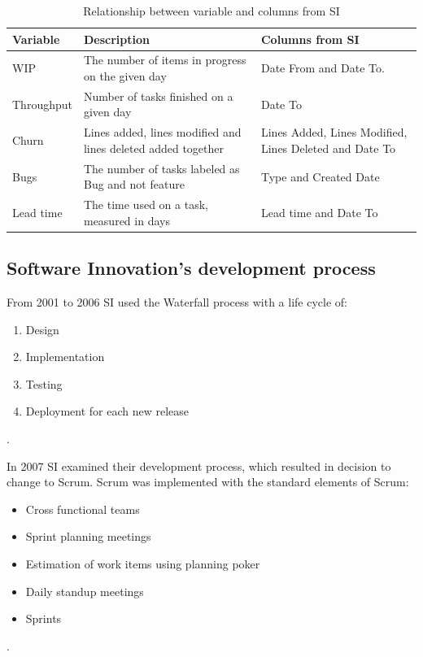 \documentclass[UKenglish]{ifimaster}  %
\begin{document}
\newpage


\begin{table}[!ht]
\begin{center}
    \begin{tabular}{| l | p{5cm} |  p{5cm} |}
    \hline
    Variable &	Description	 & Columns from SI\\ \hline 
     WIP & \parbox[t]{5cm}{The number of items in progress on the given day} & Date From and Date To. \\ \hline
     Throughput	& Number of tasks finished on a given day & Date To \\ \hline
     Churn & Lines added, lines modified and lines deleted added together & Lines Added, Lines Modified, Lines Deleted and Date To \\ \hline
    Bugs & The number of tasks labeled as Bug and not feature & Type and Created Date \\ \hline
    Lead time & The time used on a task, measured in days & Lead time and Date To \\ \hline
  \end{tabular}
\caption{Relationship between variable and columns from SI}
\label{des} %
\end{center}
\end{table}

\subsection{Software Innovation's development process}
From 2001 to 2006 SI used the Waterfall process with a life cycle of:
\begin{enumerate}[noitemsep,topsep=0pt,parsep=0pt,partopsep=0pt]
\item Design
\item Implementation 
\item Testing
\item Deployment for each new release
\end{enumerate} 
\parencite{Dag}. 

In 2007 SI examined their development process, which resulted in decision to change to Scrum. Scrum was implemented with the standard elements of Scrum:
\begin{itemize}[noitemsep,topsep=0pt,parsep=0pt,partopsep=0pt]
\item Cross functional teams
\item Sprint planning meetings 
\item Estimation of work items using planning poker
\item Daily standup meetings
\item Sprints
\end{itemize}
\parencite{Dag}. 
\end{document}
